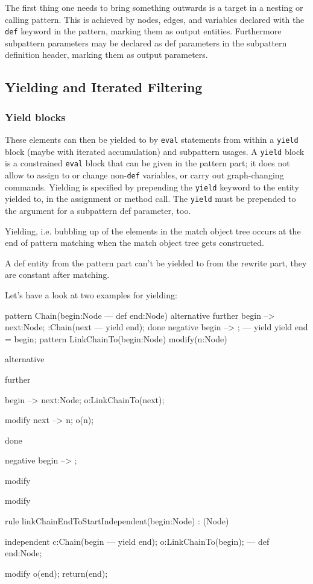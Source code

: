 The first thing one needs to bring something outwards is a target in a nesting or calling pattern. 
This is achieved by nodes, edges, and variables declared with the \texttt{def} keyword in the pattern, marking them as output entities.
Furthermore subpattern parameters may be declared as def parameters in the subpattern definition header,
marking them as output parameters.

\subsection{Yielding and Iterated Filtering} 

\subsubsection*{Yield blocks} 

These elements can then be yielded to by \texttt{eval} statements from within a \texttt{yield} block
(maybe with iterated accumulation) and subpattern usages.
A \texttt{yield} block is a constrained \texttt{eval} block that can be given in the pattern part;
it does not allow to assign to or change non-\texttt{def} variables, or carry out graph-changing commands.
Yielding is specified by prepending the \texttt{yield} keyword to the entity yielded to,
in the assignment or method call.
The \texttt{yield} must be prepended to the argument for a subpattern def parameter, too.

Yielding, i.e. bubbling up of the elements in the match object tree occurs at the end of pattern matching when the match object tree gets constructed.

\begin{warning}
A def entity from the pattern part can't be yielded to from the rewrite part, they are constant after matching.
\end{warning}

Let's have a look at two examples for yielding:

\begin{example}
  \begin{grgen}
pattern Chain(begin:Node --- def end:Node)
{
  alternative {
    further {
      begin --> next:Node;
      :Chain(next --- yield end);
    }
    done {
      negative {
        begin --> ;
      }
      ---
      yield {
        yield end = begin;
      }
    }
  }
}
pattern LinkChainTo(begin:Node) modify(n:Node)
{
  alternative {
    further {
      begin --> next:Node;
      o:LinkChainTo(next);

      modify {
        next --> n;
        o(n);
      }
    }
    done {
      negative {
        begin --> ;
      }

      modify {
      }
    }
  }

  modify { }
}
rule linkChainEndToStartIndependent(begin:Node) : (Node)
{	
  independent {
    c:Chain(begin --- yield end);
  }
  o:LinkChainTo(begin);
--- 
  def end:Node;

  modify {
    o(end);
    return(end);
  }
}
  \end{grgen}
\end{example}

